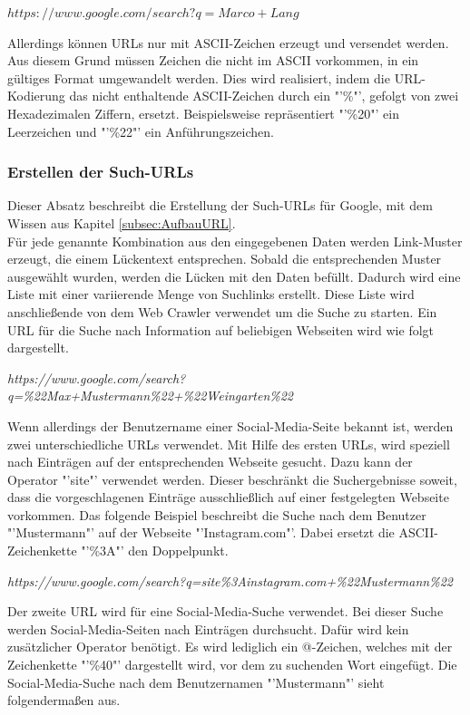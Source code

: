 			$https://www.google.com/search?q=Marco+Lang$
			
			Allerdings können URLs nur mit ASCII-Zeichen erzeugt und versendet werden. Aus diesem Grund müssen Zeichen die nicht im ASCII vorkommen, in ein gültiges Format umgewandelt werden. Dies wird realisiert, indem die URL-Kodierung das nicht enthaltende ASCII-Zeichen durch ein "'\%"', gefolgt von zwei Hexadezimalen Ziffern, ersetzt. Beispielsweise repräsentiert "'\%20"' ein Leerzeichen und "'\%22"' ein Anführungszeichen. \cite{HTMLURL} \\
			
			\subsubsection{Erstellen der Such-URLs}
			Dieser Absatz beschreibt die Erstellung der Such-URLs für Google, mit dem Wissen aus Kapitel \ref{subsec:AufbauURL}.\\
			Für jede genannte Kombination aus den eingegebenen Daten werden Link-Muster erzeugt, die einem Lückentext entsprechen. Sobald die entsprechenden Muster ausgewählt wurden, werden die Lücken mit den Daten befüllt. Dadurch wird eine Liste mit einer variierende Menge von Suchlinks erstellt. Diese Liste wird anschließende von dem Web Crawler verwendet um die Suche zu starten.
			Ein URL für die Suche nach Information auf beliebigen Webseiten wird wie folgt dargestellt.
			
			\textit{https://www.google.com/search?q=\%22Max+Mustermann\%22+\%22Weingarten\%22}
			
			Wenn allerdings der Benutzername einer Social-Media-Seite bekannt ist, werden zwei unterschiedliche URLs verwendet. Mit Hilfe des ersten URLs, wird speziell nach Einträgen auf der entsprechenden Webseite gesucht. Dazu kann der Operator "'site"' verwendet werden. Dieser beschränkt die Suchergebnisse soweit, dass die vorgeschlagenen Einträge ausschließlich auf einer festgelegten Webseite vorkommen. Das folgende Beispiel beschreibt die Suche nach dem Benutzer "'Mustermann"' auf der Webseite "'Instagram.com"'. Dabei ersetzt die ASCII-Zeichenkette "'\%3A"' den Doppelpunkt. \cite{HTMLURL}
			
			\textit{https://www.google.com/search?q=site\%3Ainstagram.com+\%22Mustermann\%22}
			
			Der zweite URL wird für eine Social-Media-Suche verwendet. Bei dieser Suche werden Social-Media-Seiten nach Einträgen durchsucht. Dafür wird kein zusätzlicher Operator benötigt. Es wird lediglich ein @-Zeichen, welches mit der Zeichenkette "'\%40"' dargestellt wird, vor dem zu suchenden Wort eingefügt. Die Social-Media-Suche nach dem Benutzernamen "'Mustermann"' sieht folgendermaßen aus.\cite{SocialMediaSearch}
			
